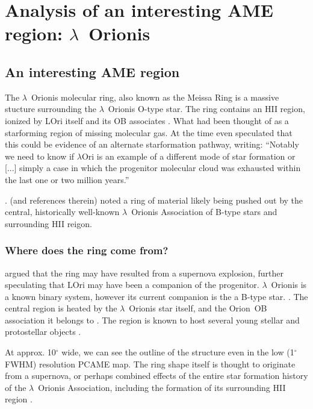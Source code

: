 \chapter{Analysis of an interesting AME region: $\lambda$~Orionis}
\label{ch:lori}

 \section{An interesting AME region}
		The $\lambda$~Orionis molecular ring, also known as the Meissa Ring is a massive stucture surrounding the $\lambda$~Orionis O-type star. The ring contains an HII region, ionized by LOri itself and its OB associates \citep{murdin77}. What had been thought of as a star\-forming region of missing molecular gas. At the time \cite{murdin77} even speculated that this could be evidence of an alternate star\-formation pathway, writing: ``Notably we need to know if $\lambda$Ori is an example of a different mode of star formation or [...] simply a case in which the progenitor molecular cloud was exhausted within the last one or two million years.''

    \cite{maddalena86,maddalena87}.  (and references therein) noted a ring of material likely being pushed out by the central, historically well-known $\lambda$~Orionis Association of B-type stars and surrounding HII reigon.

   \subsection{Where does the ring come from?}
    \cite{cunha96} argued that the ring may have resulted from a supernova explosion, further speculating that LOri may have been a companion of the progenitor. $\lambda$~Orionis is a known binary system, however its current companion is the a B-type star. \citep{murdin77}
  .
     The central region is heated by the $\lambda$~Orionis star itself, and the Orion~OB association it belongs to \citep{ochsendorf15}. The region is known to host several young stellar and protostellar objects \citep{koenig15}.

    At approx. 10$^{\circ}$ wide, we can see the outline of the structure even in the low (1$^{\circ}$ FWHM) resolution PCAME map. The ring shape itself is thought to originate from a supernova, or perhaps combined effects of the entire star formation history of the $\lambda$~Orionis Association, including the formation of its surrounding HII region \citep{aran09}.

